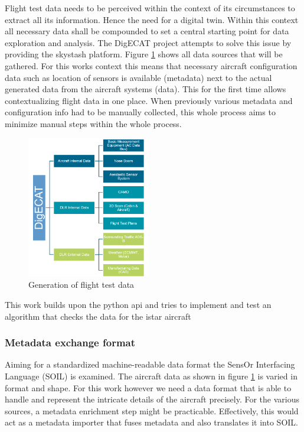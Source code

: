 Flight test data needs to be perceived within the context of its circumstances to extract all its information. Hence the need for a digital twin. Within this context all necessary data shall be compounded to set a central starting point for data exploration and analysis. The DigECAT project attempts to solve this issue by providing the skystash platform. Figure \ref{fig:digecat_data_sources} shows all data sources that will be gathered. For this works context this means that necessary aircraft configuration data such as location of sensors is available (metadata) next to the actual generated data from the aircraft systems (data). This for the first time allows contextualizing flight data in one place. When previously various metadata and configuration info had to be manually collected, this whole process aims to minimize manual steps within the whole process.

\cite{arts_digital_nodate}

\begin{figure}
    \centering
    \includegraphics[width=0.48\textwidth]{03_figures/DIGECAT}
    \caption{Generation of flight test data \cite{arts_digital_nodate} }
    \label{fig:digecat_data_sources}
\end{figure}
This work builds upon the python api and tries to implement and test an algorithm that checks the data for the istar aircraft
\cite{meyer_development_2020}




\subsubsection{Metadata exchange format}
\label{chap:2-metadata-format}

Aiming for a standardized machine-readable data format the SensOr Interfacing Language (SOIL) is examined. The aircraft data as shown in figure \ref{fig:digecat_data_sources} is varied in format and shape. For this work however we need a data format that is able to handle and represent the intricate details of the aircraft precisely. For the various sources, a metadata enrichment step might be practicable. Effectively, this would act as a metadata importer that fuses metadata and also translates it into SOIL.

